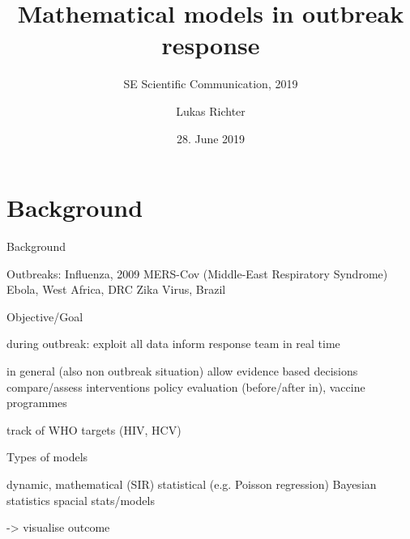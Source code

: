 \documentclass{beamer}\usepackage[]{graphicx}\usepackage[]{color}
\begin{document}
\graphicspath{{figures/}}



\title{Mathematical models in outbreak response}
\subtitle{SE Scientific Communication, 2019}
\author{Lukas Richter}
\date[]{28. June 2019}




\frame{
  \titlepage
}

\frame{
  \tableofcontents
}

\section{Background}
\begin{frame}[fragile]{Background}
\begin{center}


Outbreaks:
Influenza, 2009
MERS-Cov (Middle-East Respiratory Syndrome)
Ebola, West Africa, DRC
Zika Virus, Brazil



\end{center}
\end{frame}

\begin{frame}[fragile]{Objective/Goal}

during outbreak:
exploit all data
inform response team in real time

in general (also non outbreak situation)
allow evidence based decisions
compare/assess interventions
policy evaluation (before/after in), vaccine programmes

track of WHO targets (HIV, HCV)

\end{frame}

\begin{frame}[fragile]{Types of models}

dynamic, mathematical (SIR)
statistical (e.g. Poisson regression)
Bayesian statistics
spacial stats/models

-> visualise outcome

\end{frame}
\end{document}
